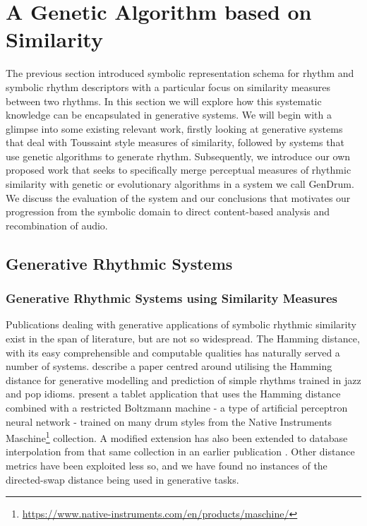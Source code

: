\section{A Genetic Algorithm based on Similarity}

The previous section introduced symbolic representation schema for rhythm and symbolic rhythm descriptors with a particular focus on similarity measures between two rhythms. In this section we will explore how this systematic knowledge can be encapsulated in generative systems. We will begin with a glimpse into some existing relevant work, firstly looking at generative systems that deal with Toussaint style measures of similarity, followed by systems that use genetic algorithms to generate rhythm. Subsequently, we introduce our own proposed work that seeks to specifically merge perceptual measures of rhythmic similarity with genetic or evolutionary algorithms in a system we call GenDrum. We discuss the evaluation of the system and our conclusions that motivates our progression from the symbolic domain to direct content-based analysis and recombination of audio.

\subsection{Generative Rhythmic Systems}

\subsubsection{Generative Rhythmic Systems using Similarity Measures}

Publications dealing with generative applications of symbolic rhythmic similarity exist in the span of literature, but are not so widespread. The Hamming distance, with its easy comprehensible and computable qualities has naturally served a number of systems. \cite{Paiement2007} describe a paper centred around utilising the Hamming distance for generative modelling and prediction of simple rhythms trained in jazz and pop idioms. \cite{Vogl2017} present a tablet application that uses the Hamming distance combined with a restricted Boltzmann machine - a type of artificial perceptron neural network - trained on many drum styles from the Native Instruments Maschine\footnote{\url{https://www.native-instruments.com/en/products/maschine/}} collection. A modified extension has also been extended to database interpolation from that same collection in an earlier  publication \citep{Vogl2016}. Other distance metrics have been exploited less so, and we have found no instances of the directed-swap distance being used in generative tasks.

